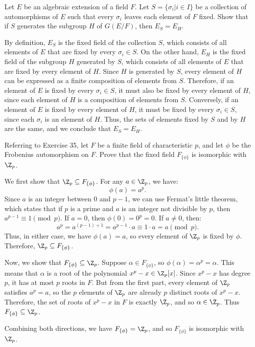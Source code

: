 \begin{problem}[43.34]
  Let $E$ be an algebraic extension of a field $F$. Let $S = \{\sigma_i | i \in I\}$ be a collection of automorphisms of $E$ such that every $\sigma_i$ leaves each element of $F$ fixed. Show that if $S$ generates the subgroup $H$ of $G(E/F)$, then $E_S = E_H$.
\end{problem}

\begin{solution}
  By definition, $E_S$ is the fixed field of the collection $S$, which consists of all elements of $E$ that are fixed by every $\sigma_i \in S$. On the other hand, $E_H$ is the fixed field of the subgroup $H$ generated by $S$, which consists of all elements of $E$ that are fixed by every element of $H$. Since $H$ is generated by $S$, every element of $H$ can be expressed as a finite composition of elements from $S$. Therefore, if an element of $E$ is fixed by every $\sigma_i \in S$, it must also be fixed by every element of $H$, since each element of $H$ is a composition of elements from $S$. Conversely, if an element of $E$ is fixed by every element of $H$, it must be fixed by every $\sigma_i \in S$, since each $\sigma_i$ is an element of $H$. Thus, the sets of elements fixed by $S$ and by $H$ are the same, and we conclude that $E_S = E_H$.
\end{solution}

\begin{problem}[43.36]
  Referring to Exercise 35, let $F$ be a finite field of characteristic $p$, and let $\phi$ be the Frobenius automorphism on $F$. Prove that the fixed field $F_{\{\phi\}}$ is isomorphic with $\Z_p$.
\end{problem}

\begin{solution}
  We first show that $\Z_p \subseteq F_{\{\phi\}}$. For any $a \in \Z_p$, we have:
  \[%
    \phi(a) = a^p
  .\]%
  Since $a$ is an integer between $0$ and $p-1$, we can use Fermat's little theorem, which states that if $p$ is a prime and $a$ is an integer not divisible by $p$, then $a^{p-1} \equiv 1 \pmod{p}$. If $a = 0$, then $\phi(0) = 0^p = 0$. If $a \neq 0$, then:
  \[%
    a^p = a^{(p-1) + 1} = a^{p-1} \cdot a \equiv 1 \cdot a = a \pmod{p}
  .\]%
  Thus, in either case, we have $\phi(a) = a$, so every element of $\Z_p$ is fixed by $\phi$. Therefore, $\Z_p \subseteq F_{\{\phi\}}$.

  Now, we show that $F_{\{\phi\}} \subseteq \Z_p$. Suppose $\alpha \in F_{\{\phi\}}$, so $\phi(\alpha) = \alpha^p = \alpha$. This means that $\alpha$ is a root of the polynomial $x^p - x \in \Z_p[x]$. Since $x^p - x$ has degree $p$, it has at most $p$ roots in $F$. But from the first part, every element of $\Z_p$ satisfies $a^p = a$, so the $p$ elements of $\Z_p$ are already $p$ distinct roots of $x^p - x$. Therefore, the set of roots of $x^p - x$ in $F$ is exactly $\Z_p$, and so $\alpha \in \Z_p$. Thus $F_{\{\phi\}} \subseteq \Z_p$.

  Combining both directions, we have $F_{\{\phi\}} = \Z_p$, and so $F_{\{\phi\}}$ is isomorphic with $\Z_p$.
\end{solution}

